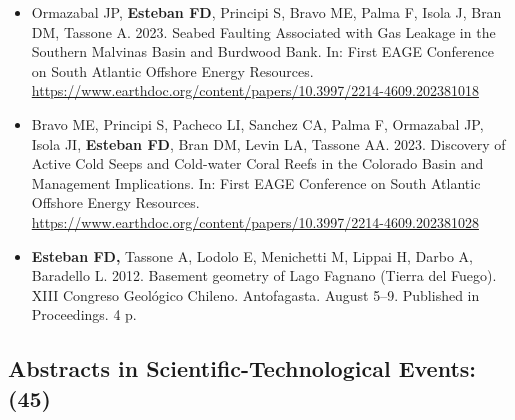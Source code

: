 \documentclass[11pt, a4paper]{article}
\begin{document}
\begin{itemize}
  \item Ormazabal JP, \textbf{Esteban FD}, Principi S, Bravo ME, Palma F, Isola J, Bran DM, Tassone A. 2023. Seabed Faulting Associated with Gas Leakage in the Southern Malvinas Basin and Burdwood Bank. In: First EAGE Conference on South Atlantic Offshore Energy Resources. \url{https://www.earthdoc.org/content/papers/10.3997/2214-4609.202381018}

  \item Bravo ME, Principi S, Pacheco LI, Sanchez CA, Palma F, Ormazabal JP, Isola JI, \textbf{Esteban FD}, Bran DM, Levin LA, Tassone AA. 2023. Discovery of Active Cold Seeps and Cold-water Coral Reefs in the Colorado Basin and Management Implications. In: First EAGE Conference on South Atlantic Offshore Energy Resources. \url{https://www.earthdoc.org/content/papers/10.3997/2214-4609.202381028}

  \item \textbf{Esteban FD,} Tassone A, Lodolo E, Menichetti M, Lippai H, Darbo A, Baradello L. 2012. Basement geometry of Lago Fagnano (Tierra del Fuego). XIII Congreso Geológico Chileno. Antofagasta. August 5--9. Published in Proceedings. 4 p.
\end{itemize}

\subsection{Abstracts in Scientific-Technological Events: (45)}
\end{document}
